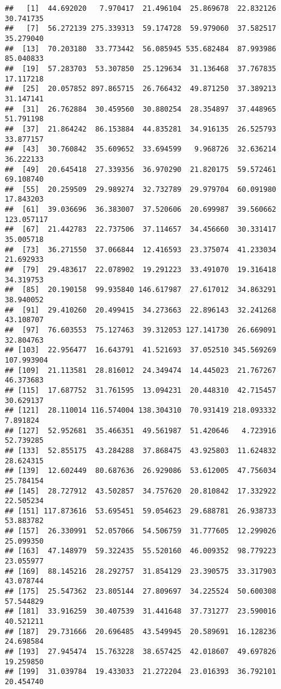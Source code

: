 \documentclass[
]{article}
\begin{document}
\begin{verbatim}
##   [1]  44.692020   7.970417  21.496104  25.869678  22.832126  30.741735
##   [7]  56.272139 275.339313  59.174728  59.979060  37.582517  35.279040
##  [13]  70.203180  33.773442  56.085945 535.682484  87.993986  85.040833
##  [19]  57.283703  53.307850  25.129634  31.136468  37.767835  17.117218
##  [25]  20.057852 897.865715  26.766432  49.871250  37.389213  31.147141
##  [31]  26.762884  30.459560  30.880254  28.354897  37.448965  51.791198
##  [37]  21.864242  86.153884  44.835281  34.916135  26.525793  33.877157
##  [43]  30.760842  35.609652  33.694599   9.968726  32.636214  36.222133
##  [49]  20.645418  27.339356  36.970290  21.820175  59.572461  69.108740
##  [55]  20.259509  29.989274  32.732789  29.979704  60.091980  17.843203
##  [61]  39.036696  36.383007  37.520606  20.699987  39.560662 123.057117
##  [67]  21.442783  22.737506  37.114657  34.456660  30.331417  35.005718
##  [73]  36.271550  37.066844  12.416593  23.375074  41.233034  21.692933
##  [79]  29.483617  22.078902  19.291223  33.491070  19.316418  34.319753
##  [85]  20.190158  99.935840 146.617987  27.617012  34.863291  38.940052
##  [91]  29.410260  20.499415  34.273663  22.896143  32.241268  43.108707
##  [97]  76.603553  75.127463  39.312053 127.141730  26.669091  32.804763
## [103]  22.956477  16.643791  41.521693  37.052510 345.569269 107.993904
## [109]  21.113581  28.816012  24.349474  14.445023  21.767267  46.373683
## [115]  17.687752  31.761595  13.094231  20.448310  42.715457  30.629137
## [121]  28.110014 116.574004 138.304310  70.931419 218.093332   7.891824
## [127]  52.952681  35.466351  49.561987  51.420646   4.723916  52.739285
## [133]  52.855175  43.284288  37.868475  43.925803  11.624832  28.624315
## [139]  12.602449  80.687636  26.929086  53.612005  47.756034  25.784154
## [145]  28.727912  43.502857  34.757620  20.810842  17.332922  22.505234
## [151] 117.873616  53.695451  59.054623  29.688781  26.938733  53.883782
## [157]  26.330991  52.057066  54.506759  31.777605  12.299026  25.099350
## [163]  47.148979  59.322435  55.520160  46.009352  98.779223  23.055977
## [169]  88.145216  28.292757  31.854129  23.390575  33.317903  43.078744
## [175]  25.547362  23.805144  27.809697  34.225524  50.600308  57.544829
## [181]  33.916259  30.407539  31.441648  37.731277  23.590016  40.521211
## [187]  29.731666  20.696485  43.549945  20.589691  16.128236  24.698584
## [193]  27.945474  15.763228  38.657425  42.018607  49.697826  19.259850
## [199]  31.039784  19.433033  21.272204  23.016393  36.792101  20.454740

\end{verbatim}
\end{document}
